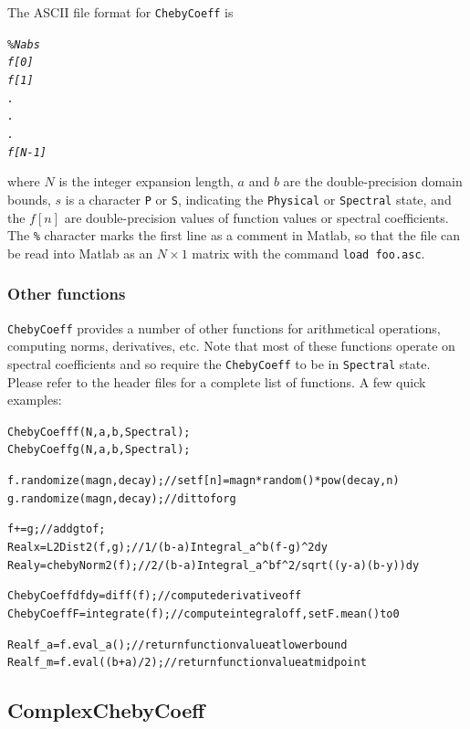 \documentclass{article}[12pt]
\begin{document}
The ASCII file format for {\tt ChebyCoeff} is
\begin{alltt}
\%{\em N a b s
f[0]
f[1]
.
.
.
f[N-1]}
\end{alltt}
where $N$ is the integer expansion length, $a$ and $b$ are the
double-precision domain bounds, $s$ is a character {\tt P} or {\tt S},
indicating the {\tt Physical} or {\tt Spectral} state, and the $f[n]$
are double-precision values of function values or spectral coefficients.
The {\tt \%} character marks the first line as a comment in Matlab,
so that the file can be read into Matlab as an $N \times 1$ matrix
with the command {\tt load foo.asc}.

\subsubsection{Other functions}

{\tt ChebyCoeff} provides a number of other functions for arithmetical
operations, computing norms, derivatives, etc. Note that most of these
functions operate on spectral coefficients and so require the
{\tt ChebyCoeff} to be in {\tt Spectral} state. Please refer to the
header files for a complete list of functions. A few quick examples:
\begin{alltt}
  ChebyCoeff f(N,a,b,Spectral);
  ChebyCoeff g(N,a,b,Spectral);

  f.randomize(magn, decay); // set f[n] = magn*random()*pow(decay,n)
  g.randomize(magn, decay); // ditto for g

  f += g;                   // add g to f;
  Real x = L2Dist2(f,g);    // 1/(b-a) Integral_a^b (f-g)^2 dy
  Real y = chebyNorm2(f);   // 2/(b-a) Integral_a^b f^2/sqrt((y-a)(b-y)) dy

  ChebyCoeff dfdy = diff(f);   // compute derivative of f
  ChebyCoeff F = integrate(f); // compute integral of f, set F.mean() to 0

  Real f_a = f.eval_a();       // return function value at lower bound
  Real f_m = f.eval((b+a)/2);  // return function value at midpoint
\end{alltt}


\subsection{ComplexChebyCoeff}
\label{sec:complexchebycoeff}
\end{document}
